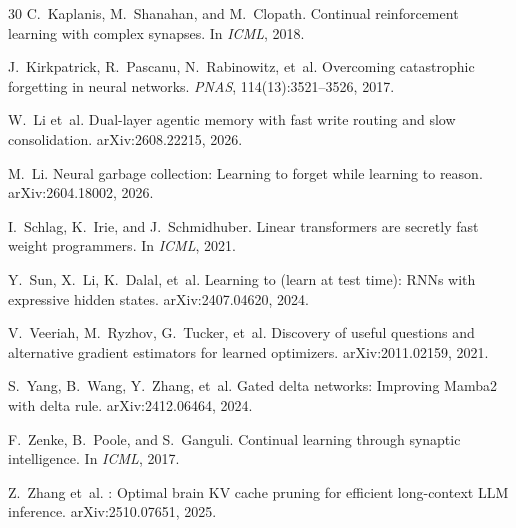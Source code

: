 \documentclass[11pt]{article}
\begin{document}
\begin{thebibliography}{30}
C.~Kaplanis, M.~Shanahan, and M.~Clopath.
\newblock Continual reinforcement learning with complex synapses.
\newblock In \emph{ICML}, 2018.

J.~Kirkpatrick, R.~Pascanu, N.~Rabinowitz, et~al.
\newblock Overcoming catastrophic forgetting in neural networks.
\newblock \emph{PNAS}, 114(13):3521--3526, 2017.

W.~Li et~al.
\newblock Dual-layer agentic memory with fast write routing and slow consolidation.
\newblock arXiv:2608.22215, 2026.

M.~Li.
\newblock Neural garbage collection: Learning to forget while learning to reason.
\newblock arXiv:2604.18002, 2026.

I.~Schlag, K.~Irie, and J.~Schmidhuber.
\newblock Linear transformers are secretly fast weight programmers.
\newblock In \emph{ICML}, 2021.

Y.~Sun, X.~Li, K.~Dalal, et~al.
\newblock Learning to (learn at test time): {RNNs} with expressive hidden states.
\newblock arXiv:2407.04620, 2024.

V.~Veeriah, M.~Ryzhov, G.~Tucker, et~al.
\newblock Discovery of useful questions and alternative gradient estimators for learned optimizers.
\newblock arXiv:2011.02159, 2021.

S.~Yang, B.~Wang, Y.~Zhang, et~al.
\newblock Gated delta networks: Improving {Mamba2} with delta rule.
\newblock arXiv:2412.06464, 2024.

F.~Zenke, B.~Poole, and S.~Ganguli.
\newblock Continual learning through synaptic intelligence.
\newblock In \emph{ICML}, 2017.

Z.~Zhang et~al.
: Optimal brain {KV} cache pruning for efficient long-context {LLM} inference.
\newblock arXiv:2510.07651, 2025.

\end{thebibliography}

\appendix
\end{document}

